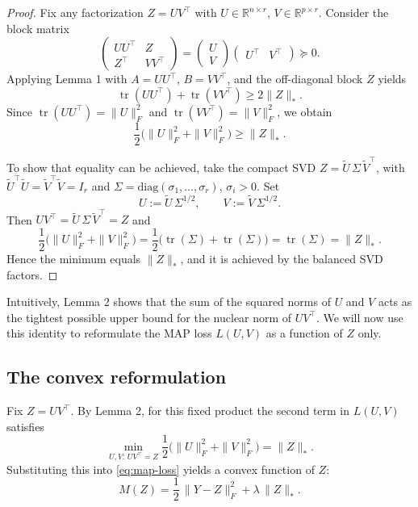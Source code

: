\documentclass[11pt]{article}
\theoremstyle{spaced}
\begin{document}
\begin{proof}
Fix any factorization \(Z = UV^\top\) with \(U \in \mathbb{R}^{n \times r}\), \(V \in \mathbb{R}^{p \times r}\).
Consider the block matrix
\[
\begin{pmatrix}
UU^\top & Z\\[2pt]
Z^\top & VV^\top
\end{pmatrix}
=
\begin{pmatrix}
U\\[2pt]
V
\end{pmatrix}
\begin{pmatrix}
U^\top & V^\top
\end{pmatrix}
\succeq 0.
\]
Applying Lemma 1 with \(A = UU^\top\), \(B = VV^\top\), and the off-diagonal block \(Z\) yields
\[
\operatorname{tr}(UU^\top) + \operatorname{tr}(VV^\top)
\ge
2\|Z\|_*.
\]
Since \(\operatorname{tr}(UU^\top) = \|U\|_F^2\) and \(\operatorname{tr}(VV^\top) = \|V\|_F^2\), we obtain
\[
\frac{1}{2}\big(\|U\|_F^2 + \|V\|_F^2\big) \ge \|Z\|_*.
\]

To show that equality can be achieved, take the compact SVD \(Z = \widetilde U\,\Sigma\,\widetilde V^\top\), with 
\(\widetilde U^\top \widetilde U = \widetilde V^\top \widetilde V = I_r\) and 
\(\Sigma = \mathrm{diag}(\sigma_1,\ldots,\sigma_r)\), \(\sigma_i > 0\).
Set
\[
U := \widetilde U\,\Sigma^{1/2}, \qquad V := \widetilde V\,\Sigma^{1/2}.
\]
Then \(UV^\top = \widetilde U\,\Sigma\,\widetilde V^\top = Z\) and
\[
\frac{1}{2}\big(\|U\|_F^2 + \|V\|_F^2\big)
= \frac{1}{2}\big(\operatorname{tr}(\Sigma) + \operatorname{tr}(\Sigma)\big)
= \operatorname{tr}(\Sigma)
= \|Z\|_*.
\]
Hence the minimum equals \(\|Z\|_*\), and it is achieved by the balanced SVD factors.
\end{proof}

Intuitively, Lemma 2 shows that the sum of the squared norms of \(U\) and \(V\) acts as the tightest possible upper bound for the nuclear norm of \(UV^\top\).  
We will now use this identity to reformulate the MAP loss \(L(U,V)\) as a function of \(Z\) only.

\subsection*{The convex reformulation}

Fix \(Z = UV^\top\).  
By Lemma 2, for this fixed product the second term in \(L(U,V)\) satisfies
\[
\min_{U,V :\, UV^\top = Z}
\frac{1}{2}\big(\|U\|_F^2 + \|V\|_F^2\big)
= \|Z\|_*.
\]
Substituting this into \eqref{eq:map-loss} yields a convex function of \(Z\):
\begin{equation}
M(Z)
= \frac{1}{2}\,\|Y - Z\|_F^2
  + \lambda\,\|Z\|_*.
\label{eq:convex-loss}
\end{equation}
\end{document}
